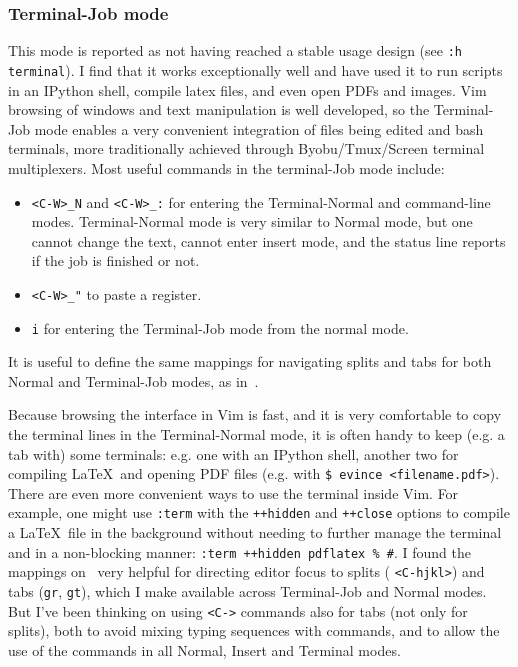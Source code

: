 \documentclass{article}
\newcommand{\ttt}[1] {
	\texttt{<#1>}}
\newcommand{\tttt}[1]{\texttt{#1}}
\begin{document}
\subsubsection{Terminal-Job mode}\label{terminal}
This mode is reported as not having reached a stable usage design
(see \tttt{:h terminal}).
I find that it works exceptionally well and have used it to run
scripts in an IPython shell, compile latex files, and even open PDFs and images.
Vim browsing of windows and text manipulation is well developed,
so the Terminal-Job mode enables a very convenient integration
of files being edited and bash terminals,
more traditionally achieved through Byobu/Tmux/Screen terminal
multiplexers.
Most useful commands in the terminal-Job mode include:
\begin{itemize}
  \item \tttt{<C-W>\_N} and \tttt{<C-W>\_:} for entering the Terminal-Normal
    and command-line modes. Terminal-Normal mode is very similar to
    Normal mode, but one cannot change the text, cannot enter insert
    mode, and the status line reports if the job is finished or not.
  \item \tttt{<C-W>\_"} to paste a register.
  \item \tttt{i} for entering the Terminal-Job mode from the normal mode.
\end{itemize}
\noindent It is useful to define the same mappings for navigating splits and tabs
for both Normal and Terminal-Job modes, as in~\cite{vimrc}.

Because browsing the interface in Vim is fast,
and it is very comfortable to copy the terminal lines
in the Terminal-Normal mode,
it is often handy to keep (e.g. a tab with) some terminals:
e.g. one with an IPython shell, another two for compiling \LaTeX\
and opening PDF files (e.g. with \tttt{\$ evince <filename.pdf>}).
There are even more convenient ways to use the terminal inside Vim.
For example, 
one might use \tttt{:term} with the \tttt{++hidden} and \tttt{++close}
options to compile a \LaTeX\ file in the background without needing to further manage the
terminal and in a non-blocking manner: \tttt{:term ++hidden pdflatex
\% \#}.
I found the mappings on~\cite{vimrc} very helpful for directing
editor focus to splits (\ttt{C-hjkl}) and tabs (\tttt{gr}, \tttt{gt}),
which I make available across Terminal-Job and Normal modes.
But I've been thinking on using \ttt{C-} commands also
for tabs (not only for splits), both to avoid mixing typing sequences
with commands, and to allow the use of the commands in all Normal,
Insert and Terminal modes.
\end{document}
